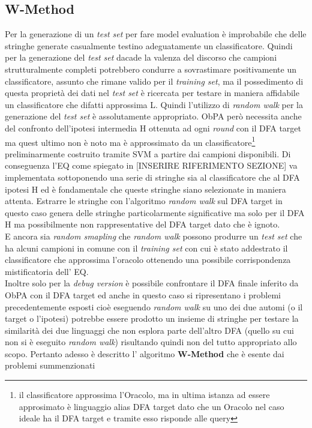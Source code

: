 \subsection{W-Method}
Per la generazione di un \textit{test set} per fare model evaluation  è improbabile che delle stringhe generate casualmente testino adeguatamente un classificatore. Quindi per la generazione del \textit{test set} dacade la valenza del discorso che campioni strutturalmente completi potrebbero condurre a sovrastimare positivamente un classificatore, assunto che rimane valido per il \textit{training set}, ma il possedimento di questa proprietà dei dati nel \textit{test set} è ricercata per testare in maniera affidabile un classificatore che difatti approssima \ac{L}. Quindi l'utilizzo di \textit{random walk} per la generazione del \textit{test set} è assolutamente appropriato.    \ac{ObPA} però necessita anche del confronto dell'ipotesi intermedia \ac{H} ottenuta ad ogni \textit{round} con il \ac{DFA} target ma quest ultimo non è noto ma è approssimato da un classificatore\footnote{il classificatore approssima l'Oracolo, ma in ultima istanza ad essere approsimato è linguaggio alias \ac{DFA} target dato che un Oracolo nel caso ideale ha il \ac{DFA} target e tramite esso risponde alle query} preliminarmente costruito tramite \ac{SVM} a partire dai campioni disponibili.   Di conseguenza l'\ac{EQ} come spiegato in [INSERIRE RIFERIMENTO SEZIONE] va implementata sottoponendo  una serie di stringhe sia al classificatore che al \ac{DFA} ipotesi \ac{H} ed è fondamentale che queste stringhe siano selezionate in maniera attenta. Estrarre le stringhe con l'algoritmo \textit{random walk} sul \ac{DFA} target in questo caso genera delle stringhe particolarmente significative ma solo per il \ac{DFA} \ac{H} ma possibilmente non rappresentative del \ac{DFA} target dato che è ignoto.\\
 E ancora sia  \textit{random smapling} che \textit{random walk} possono produrre un \textit{test set} che ha alcuni campioni in comune con il \textit{training set} con cui è stato addestrato il classificatore che approssima l'oracolo ottenendo una possibile corrispondenza mistificatoria dell' \ac{EQ}.\\
 Inoltre solo per la \textit{debug version} è possibile confrontare il \ac{DFA} finale inferito da \ac{ObPA} con il \ac{DFA} target ed anche in questo caso si ripresentano i problemi precedentemente esposti cioè eseguendo \textit{random walk} su uno dei due automi (o il target o l'ipotesi) potrebbe essere prodotto un insieme di stringhe per testare la similarità dei due linguaggi che non esplora parte dell'altro \ac{DFA} (quello su cui non si è eseguito \textit{random walk}) risultando quindi non del tutto appropriato allo scopo. Pertanto adesso è descritto l' algoritmo \textbf{W-Method} \cite{Chow78} che è esente dai problemi summenzionati

